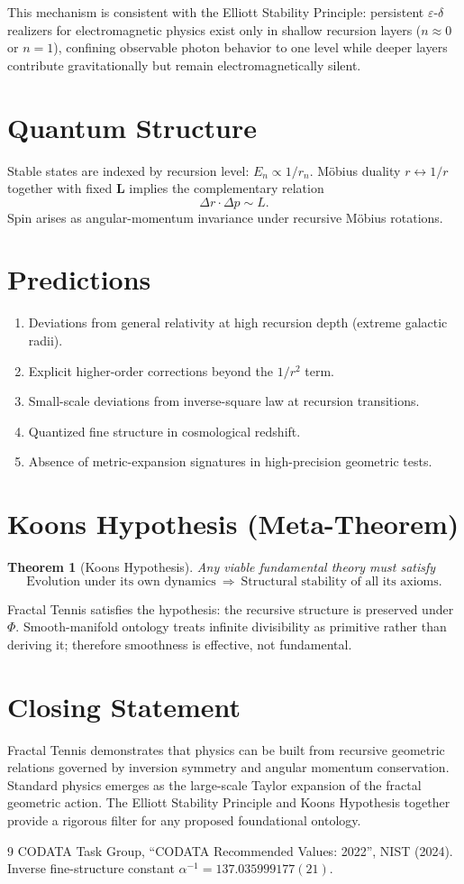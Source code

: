 \documentclass[11pt,a4paper]{article}
\newtheorem{theorem}{Theorem}
\begin{document}
This mechanism is consistent with the Elliott Stability Principle: persistent $\varepsilon$-$\delta$ realizers for electromagnetic physics exist only in shallow recursion layers ($n \approx 0$ or $n=1$), confining observable photon behavior to one level while deeper layers contribute gravitationally but remain electromagnetically silent.

\section{Quantum Structure}
Stable states are indexed by recursion level: $E_n\propto1/r_n$. M\"obius duality $r\leftrightarrow1/r$ together with fixed $\mathbf{L}$ implies the complementary relation
\[
\Delta r\cdot\Delta p\sim L.
\]
Spin arises as angular-momentum invariance under recursive M\"obius rotations.

\section{Predictions}
\begin{enumerate}
\item Deviations from general relativity at high recursion depth (extreme galactic radii).
\item Explicit higher-order corrections beyond the $1/r^2$ term.
\item Small-scale deviations from inverse-square law at recursion transitions.
\item Quantized fine structure in cosmological redshift.
\item Absence of metric-expansion signatures in high-precision geometric tests.
\end{enumerate}

\section{Koons Hypothesis (Meta-Theorem)}
\begin{theorem}[Koons Hypothesis]
Any viable fundamental theory must satisfy
\[
\text{Evolution under its own dynamics}\ \Rightarrow\ \text{Structural stability of all its axioms}.
\]
\end{theorem}
Fractal Tennis satisfies the hypothesis: the recursive structure is preserved under $\Phi$. Smooth-manifold ontology treats infinite divisibility as primitive rather than deriving it; therefore smoothness is effective, not fundamental.

\section{Closing Statement}
Fractal Tennis demonstrates that physics can be built from recursive geometric relations governed by inversion symmetry and angular momentum conservation. Standard physics emerges as the large-scale Taylor expansion of the fractal geometric action. The Elliott Stability Principle and Koons Hypothesis together provide a rigorous filter for any proposed foundational ontology.

\begin{thebibliography}{9}
CODATA Task Group, ``CODATA Recommended Values: 2022'', NIST (2024).
Inverse fine-structure constant $\alpha^{-1} = 137.035999177(21)$.
\end{thebibliography}
\end{document}
